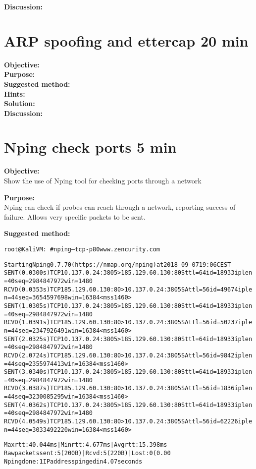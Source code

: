 \documentclass[a4paper,11pt,notitlepage]{report}
\begin{document}
{\bf Discussion:}\\

\chapter{ARP spoofing and ettercap 20 min}
\label{ex:arp-spoof-ettercap}

{\bf Objective:}\\


{\bf Purpose:}\\


{\bf Suggested method:}\\


{\bf Hints:}\\


{\bf Solution:}\\


{\bf Discussion:}\\



\chapter{Nping check ports 5 min}
\label{ex:nping-tcp}
{\bf Objective:} \\
Show the use of Nping tool for checking ports through a network

{\bf Purpose:}\\
Nping can check if probes can reach through a network, reporting success of failure. Allows very specific packets to be sent.

{\bf Suggested method:}\\
\begin{alltt}\footnotesize
  root@KaliVM:~# nping --tcp -p 80 www.zencurity.com

  Starting Nping 0.7.70 ( https://nmap.org/nping ) at 2018-09-07 19:06 CEST
  SENT (0.0300s) TCP 10.137.0.24:3805 > 185.129.60.130:80 S ttl=64 id=18933 iplen=40  seq=2984847972 win=1480
  RCVD (0.0353s) TCP 185.129.60.130:80 > 10.137.0.24:3805 SA ttl=56 id=49674 iplen=44  seq=3654597698 win=16384 <mss 1460>
  SENT (1.0305s) TCP 10.137.0.24:3805 > 185.129.60.130:80 S ttl=64 id=18933 iplen=40  seq=2984847972 win=1480
  RCVD (1.0391s) TCP 185.129.60.130:80 > 10.137.0.24:3805 SA ttl=56 id=50237 iplen=44  seq=2347926491 win=16384 <mss 1460>
  SENT (2.0325s) TCP 10.137.0.24:3805 > 185.129.60.130:80 S ttl=64 id=18933 iplen=40  seq=2984847972 win=1480
  RCVD (2.0724s) TCP 185.129.60.130:80 > 10.137.0.24:3805 SA ttl=56 id=9842 iplen=44  seq=2355974413 win=16384 <mss 1460>
  SENT (3.0340s) TCP 10.137.0.24:3805 > 185.129.60.130:80 S ttl=64 id=18933 iplen=40  seq=2984847972 win=1480
  RCVD (3.0387s) TCP 185.129.60.130:80 > 10.137.0.24:3805 SA ttl=56 id=1836 iplen=44  seq=3230085295 win=16384 <mss 1460>
  SENT (4.0362s) TCP 10.137.0.24:3805 > 185.129.60.130:80 S ttl=64 id=18933 iplen=40  seq=2984847972 win=1480
  RCVD (4.0549s) TCP 185.129.60.130:80 > 10.137.0.24:3805 SA ttl=56 id=62226 iplen=44  seq=3033492220 win=16384 <mss 1460>

  Max rtt: 40.044ms | Min rtt: 4.677ms | Avg rtt: 15.398ms
  Raw packets sent: 5 (200B) | Rcvd: 5 (220B) | Lost: 0 (0.00%)
  Nping done: 1 IP address pinged in 4.07 seconds
\end{alltt}
\end{document}
